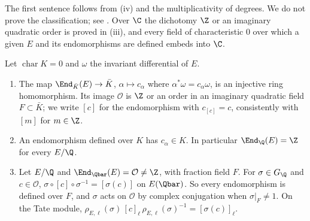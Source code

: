 \noindent The first sentence follows from (iv) and the multiplicativity of degrees. We do not prove the classification; see
\cite[Sections III.9 and V.3]{SilvermanAEC}. Over $\C$ the dichotomy $\Z$ or an imaginary quadratic order is proved in (iii), and every
field of characteristic $0$ over which a given $E$ and its endomorphisms are defined embeds into $\C$.

\begin{proposition}\label{prop:ellcurves:normalised}
Let $\operatorname{char}K=0$ and $\omega$ the invariant differential of $E$.
\begin{enumerate}[label=(\roman*)]
\item The map $\End_{\bar K}(E)\to\bar K$, $\alpha\mapsto c_\alpha$ where $\alpha^*\omega=c_\alpha\omega$, is an injective ring homomorphism. Its image $\mathcal O$ is $\Z$ or an order in an
imaginary quadratic field $F\subset\bar K$; we write $[c]$ for the endomorphism with $c_{[c]}=c$, consistently with $[m]$ for $m\in\Z$.
\item An endomorphism defined over $K$ has $c_\alpha\in K$. In particular $\End_\Q(E)=\Z$ for every $E/\Q$.
\item Let $E/\Q$ and $\End_{\Qbar}(E)=\mathcal O\ne\Z$, with fraction field $F$. For $\sigma\in G_\Q$ and $c\in\mathcal O$, $\sigma\circ[c]\circ\sigma^{-1}=[\sigma(c)]$ on $E(\Qbar)$. So every
endomorphism is defined over $F$, and $\sigma$ acts on $\mathcal O$ by complex conjugation when $\sigma|_F\ne1$. On the Tate module,
$\rho_{E,\ell}(\sigma)\,[c]_\ell\,\rho_{E,\ell}(\sigma)^{-1}=[\sigma(c)]_\ell$.
\end{enumerate}
\end{proposition}

